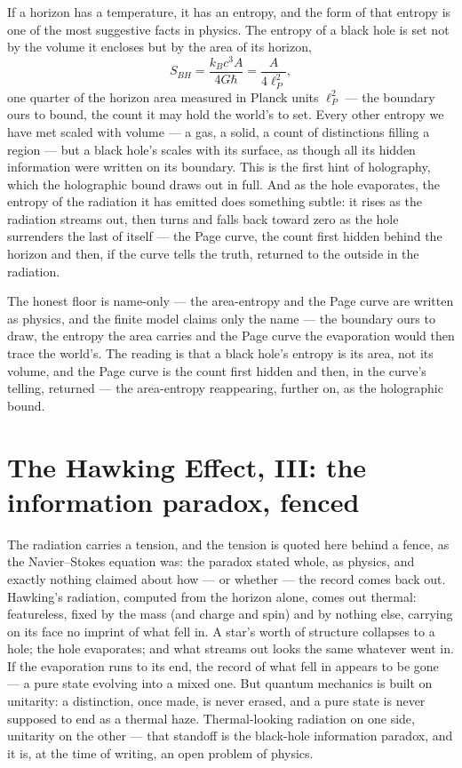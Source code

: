 If a horizon has a temperature, it has an entropy, and the form of that entropy is one of the most suggestive
facts in physics. The entropy of a black hole is set not by the volume it encloses but by the area of its
horizon,
\begin{equation}
  S_{BH} = \frac{k_B c^3 A}{4 G \hbar} = \frac{A}{4\ell_P^2},
\end{equation}
one quarter of the horizon area measured in Planck units $\ell_P^2$ --- the boundary ours to bound, the count it
may hold the world's to set. Every other entropy we have met scaled with volume --- a gas, a solid, a count of
distinctions filling a region --- but a black hole's scales with its surface, as though all its hidden
information were written on its boundary. This is the first hint of
holography, which the holographic bound draws out in full. And as the hole evaporates, the entropy of the
radiation it has emitted does something subtle: it rises as the radiation streams out, then turns and falls
back toward zero as the hole surrenders the last of itself --- the Page curve, the count first hidden behind
the horizon and then, if the curve tells the truth, returned to the outside in the radiation.

The honest floor is name-only --- the area-entropy and the Page curve are written as physics, and the finite
model claims only the name --- the boundary ours to draw, the entropy the area carries and the Page curve the
evaporation would then trace the world's. The reading is that a black hole's entropy is its area, not its volume, and the
Page curve is the count first hidden and then, in the curve's telling, returned --- the area-entropy
reappearing, further on, as the holographic bound.

\section{The Hawking Effect, III: the information paradox, fenced}
\label{se:hawking-paradox}

The radiation carries a tension, and the tension is quoted here behind a fence, as the Navier--Stokes equation
was: the paradox stated whole, as physics, and exactly nothing claimed about how --- or whether --- the record
comes back out. Hawking's radiation, computed from the horizon alone, comes out
thermal: featureless, fixed by the mass (and charge and spin) and by nothing else, carrying on its face no
imprint of what fell in. A star's worth of structure collapses to a hole; the hole evaporates; and what streams
out looks the same whatever went in. If the evaporation runs to its end, the record of what fell in appears to
be gone --- a pure state evolving into a mixed one. But quantum mechanics is built on unitarity: a distinction,
once made, is never erased, and a pure state is never supposed to end as a thermal haze. Thermal-looking
radiation on one side, unitarity on the other --- that standoff is the black-hole information paradox, and it
is, at the time of writing, an open problem of physics.

